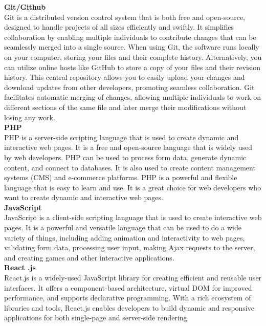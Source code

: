 \textbf{Git/Github}\\
Git is a distributed version control system that is both free and open-source, designed to handle projects of all sizes efficiently and swiftly. It simplifies collaboration by enabling multiple individuals to contribute changes that can be seamlessly merged into a single source. When using Git, the software runs locally on your computer, storing your files and their complete history. Alternatively, you can utilize online hosts like GitHub to store a copy of your files and their revision history. This central repository allows you to easily upload your changes and download updates from other developers, promoting seamless collaboration. Git facilitates automatic merging of changes, allowing multiple individuals to work on different sections of the same file and later merge their modifications without losing any work.\\
\textbf{PHP}\\
PHP is a server-side scripting language that is used to create dynamic and interactive web pages. It is a free and open-source language that is widely used by web developers. PHP can be used to process form data, generate dynamic content, and connect to databases. It is also used to create content management systems (CMS) and e-commerce platforms.
PHP is a powerful and flexible language that is easy to learn and use. It is a great choice for web developers who want to create dynamic and interactive web pages.\\
\textbf{JavaScript}\\
JavaScript is a client-side scripting language that is used to create interactive web pages. It is a powerful and versatile language that can be used to do a wide variety of things, including adding animation and interactivity to web pages, validating form data, processing user input, making Ajax requests to the server, and creating games and other interactive applications.\\
\textbf{React .js}\\
React.js is a widely-used JavaScript library for creating efficient and reusable user interfaces. It offers a component-based architecture, virtual DOM for improved performance, and supports declarative programming. With a rich ecosystem of libraries and tools, React.js enables developers to build dynamic and responsive applications for both single-page and server-side rendering.\\
